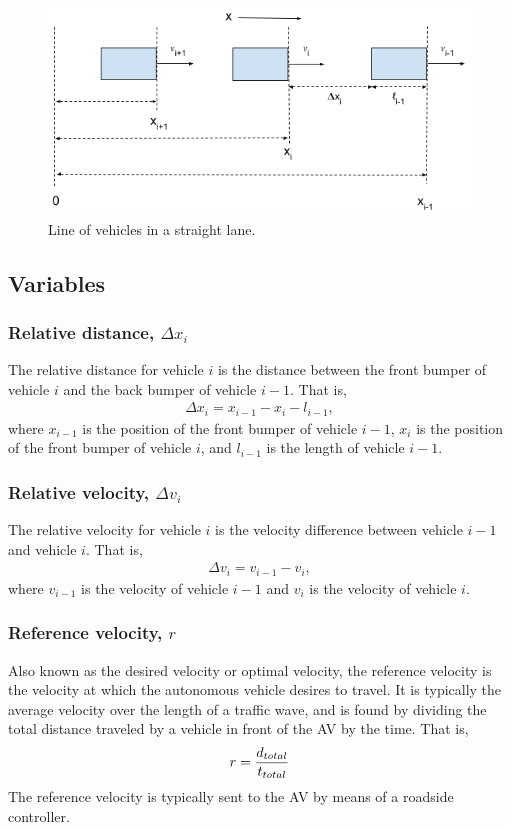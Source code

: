 \documentclass[conference]{IEEEtran}
\begin{document}
\begin{figure}[htbp]
\centerline{\includegraphics[width=3.75 in]{carLane.png}}
\caption{Line of vehicles in a straight lane.}
\label{fig1}
\end{figure}

\subsection{Variables}
\subsubsection{Relative distance, $\Delta x_i$} 
The relative distance for vehicle $i$ is the distance between the front bumper of vehicle $i$ and the back bumper of vehicle $i-1$. That is,
\begin{eqnarray}
\Delta x_i = x_{i-1}-x_i-l_{i-1},
\end{eqnarray}
where $x_{i-1}$ is the position of the front bumper of vehicle $i-1$, $x_i$ is the position of the front bumper of vehicle $i$, and $l_{i-1}$ is the length of vehicle $i-1$.
\subsubsection{Relative velocity, $\Delta v_i$}
The relative velocity for vehicle $i$ is the velocity difference between vehicle $i-1$ and vehicle $i$. That is,
\begin{eqnarray}
\Delta v_i=v_{i-1}-v_i,
\end{eqnarray}
where $v_{i-1}$ is the velocity of vehicle $i-1$ and $v_i$ is the velocity of vehicle $i$.
\subsubsection{Reference velocity, $r$}
Also known as the desired velocity or optimal velocity, the reference velocity is the velocity at which the autonomous vehicle desires to travel. It is typically the average velocity over the length of a traffic wave, and is found by dividing the total distance traveled by a vehicle in front of the AV by the time. That is,
\begin{eqnarray}
r={d_{total}\over t_{total}}
\end{eqnarray}
The reference velocity is typically sent to the AV by means of a roadside controller.
\end{document}
